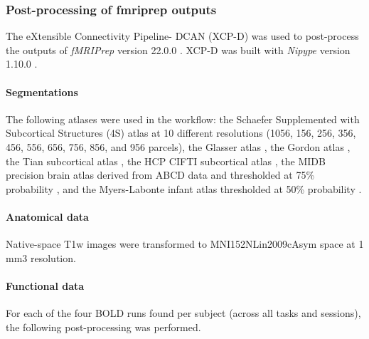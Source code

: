 \documentclass[]{article}
\date{}
\let\oldparagraph\paragraph
\renewcommand{\paragraph}[1]{\oldparagraph{#1}\mbox{}}
\begin{document}
\hypertarget{post-processing-of-fmriprep-outputs}{%
\subsubsection{Post-processing of fmriprep
outputs}\label{post-processing-of-fmriprep-outputs}}

The eXtensible Connectivity Pipeline- DCAN (XCP-D)
\citep{mehta2024xcp, mitigating_2018, satterthwaite_2013} was used to
post-process the outputs of \emph{fMRIPrep} version 22.0.0
\citep[RRID:SCR\_016216]{esteban2019fmriprep, esteban2020analysis}.
XCP-D was built with \emph{Nipype} version 1.10.0
\citep[RRID:SCR\_002502]{nipype1}.

\hypertarget{segmentations}{%
\paragraph{Segmentations}\label{segmentations}}

The following atlases were used in the workflow: the Schaefer
Supplemented with Subcortical Structures (4S) atlas
\citep{Schaefer_2017, pauli2018high, king2019functional, najdenovska2018vivo, glasser2013minimal}
at 10 different resolutions (1056, 156, 256, 356, 456, 556, 656, 756,
856, and 956 parcels), the Glasser atlas \citep{Glasser_2016}, the
Gordon atlas \citep{Gordon_2014}, the Tian subcortical atlas
\citep{tian2020topographic}, the HCP CIFTI subcortical atlas
\citep{glasser2013minimal}, the MIDB precision brain atlas derived from
ABCD data and thresholded at 75\% probability
\citep{hermosillo2024precision}, and the Myers-Labonte infant atlas
thresholded at 50\% probability \citep{myers2023functional}.

\hypertarget{anatomical-data}{%
\paragraph{Anatomical data}\label{anatomical-data}}

Native-space T1w images were transformed to MNI152NLin2009cAsym space at
1 mm3 resolution.

\hypertarget{functional-data}{%
\paragraph{Functional data}\label{functional-data}}

For each of the four BOLD runs found per subject (across all tasks and
sessions), the following post-processing was performed.
\end{document}
